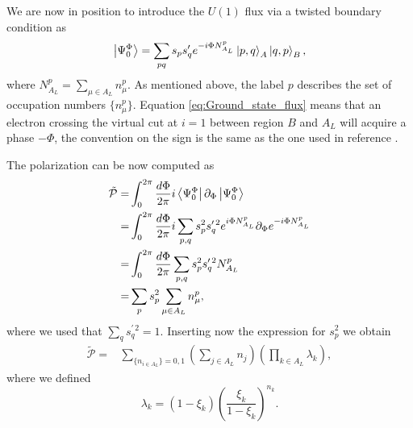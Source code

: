 \documentclass[twocolumn,amsmath,longbibliography,amssymb,superscriptaddress]{revtex4-1}
\begin{document}
We are now in position to introduce the $U(1)$ flux via a twisted boundary condition as
\begin{equation}
\ket{\Psi_0^\Phi} = \sum_{pq} s_p s_q' e^{-i\Phi N_{A_L}^p} \ket{p,q}_A \ket{q,p}_B,
\label{eq:Ground_state_flux}
\end{equation}
where $N_{A_L}^p = \sum_{\mu \in A_L}n_\mu^p$. As mentioned above, the label $p$ describes the set of occupation numbers $\{n_\mu^p\}$. Equation \eqref{eq:Ground_state_flux} means that an electron crossing the virtual cut at $i=1$ between region $B$ and $A_L$ will acquire a phase $-\Phi$, the convention on the sign is the same as the one used in reference \cite{Watanabe2018}. 

The polarization can be now computed as
\begin{align}
\tilde{\mathcal{P}} =& \int_0^{2\pi} \frac{d\Phi}{2\pi}i\bra{\Psi_0^\Phi}\partial_\Phi\ket{\Psi_0^\Phi} \\
=& \int_0^{2\pi} \frac{d\Phi}{2\pi}i\sum_{p,q} s_p^2 s_q^{\prime \, 2} e^{i\Phi N_{A_L}^p}\partial_{\Phi}e^{-i\Phi  N_{A_L}^p}\\
=&\int_0^{2\pi} \frac{d\Phi}{2\pi}\sum_{p,q} s_p^2 s_q^{\prime \, 2}  N_{A_L}^p\\
=&\sum_{p} s_p^2 \sum_{\mu \in A_L}n^p_\mu,
\end{align}
where we used that $\sum_q s_q^{\prime \,2} = 1$. Inserting now the expression for $s_p^2$ we obtain
\begin{align}
\tilde{\mathcal{P}}=&\sum_{\{n_{i \in A_L}\} = 0,1} \left(\sum_{j\in A_{L}} n_j \right) \left(\prod_{k\in A_L} \lambda_k \right),
\end{align} 
where we defined
\begin{equation}
\lambda_k = (1- \xi_k)\left(\frac{\xi_k}{1-\xi_k} \right)^{n_k}.
\end{equation}
\end{document}
